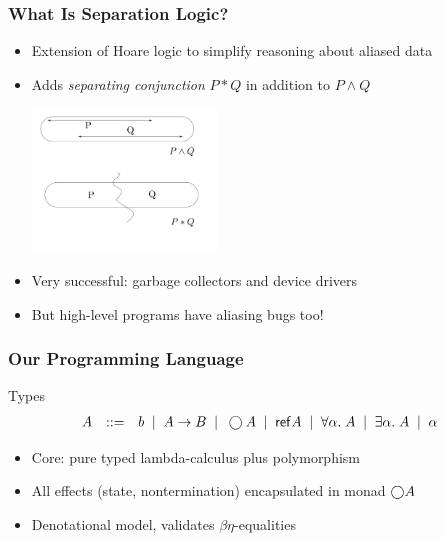 \documentclass[svgnames]{beamer}
\begin{document}
\begin{frame}
  \frametitle{What Is Separation Logic?}

    \begin{itemize}
      \item Extension of Hoare logic to simplify reasoning about aliased data
      \item Adds \emph{separating conjunction} $P * Q$ in addition 
        to $P \land Q$
        \begin{center}
        \includegraphics[height=1.5in]{separating-conjunction.pdf}
        \end{center}
      \item Very successful: garbage collectors and device drivers
      \item \pause But high-level programs have aliasing bugs too!
    \end{itemize}
\end{frame}

\begin{frame}
\frametitle{Our Programming Language}

\begin{block}{Types}
\begin{displaymath}
 \begin{array}{llcl}
    A & ::= & b \;\;|\;\; A \to B \;\;|\;\; \bigcirc{A} \;\;|\;\; \mbox{\textsf{{ref}}}A 
   \;\;|\;\;  \forall \alpha.\;A \;\;|\;\; \exists \alpha.\;A \;\;|\;\; \alpha \\
  \end{array}
\end{displaymath}
\end{block}

\begin{itemize}
  \item Core: pure typed lambda-calculus plus polymorphism
  \item All effects (state, nontermination) encapsulated in monad $\bigcirc{A}$
  \item Denotational model, validates $\beta\eta$-equalities
\end{itemize}
\end{frame}
\end{document}
